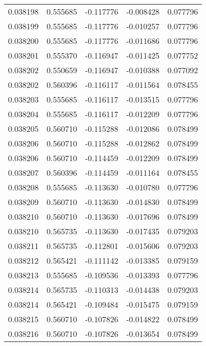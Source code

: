 \begin{tabular}{lrrrr}
0.038198    &  0.555685 & -0.117776 & -0.008428 &             0.077796 \\
0.038199    &  0.555685 & -0.117776 & -0.010257 &             0.077796 \\
0.038200    &  0.555685 & -0.117776 & -0.011686 &             0.077796 \\
0.038201    &  0.555370 & -0.116947 & -0.011425 &             0.077752 \\
0.038202    &  0.550659 & -0.116947 & -0.010388 &             0.077092 \\
0.038202    &  0.560396 & -0.116117 & -0.011564 &             0.078455 \\
0.038203    &  0.555685 & -0.116117 & -0.013515 &             0.077796 \\
0.038204    &  0.555685 & -0.116117 & -0.012209 &             0.077796 \\
0.038205    &  0.560710 & -0.115288 & -0.012086 &             0.078499 \\
0.038206    &  0.560710 & -0.115288 & -0.012862 &             0.078499 \\
0.038206    &  0.560710 & -0.114459 & -0.012209 &             0.078499 \\
0.038207    &  0.560396 & -0.114459 & -0.011164 &             0.078455 \\
0.038208    &  0.555685 & -0.113630 & -0.010780 &             0.077796 \\
0.038209    &  0.560710 & -0.113630 & -0.014830 &             0.078499 \\
0.038210    &  0.560710 & -0.113630 & -0.017696 &             0.078499 \\
0.038210    &  0.565735 & -0.113630 & -0.017435 &             0.079203 \\
0.038211    &  0.565735 & -0.112801 & -0.015606 &             0.079203 \\
0.038212    &  0.565421 & -0.111142 & -0.013385 &             0.079159 \\
0.038213    &  0.555685 & -0.109536 & -0.013393 &             0.077796 \\
0.038214    &  0.565735 & -0.110313 & -0.014438 &             0.079203 \\
0.038214    &  0.565421 & -0.109484 & -0.015475 &             0.079159 \\
0.038215    &  0.560710 & -0.107826 & -0.014822 &             0.078499 \\
0.038216    &  0.560710 & -0.107826 & -0.013654 &             0.078499 \\

\end{tabular}
